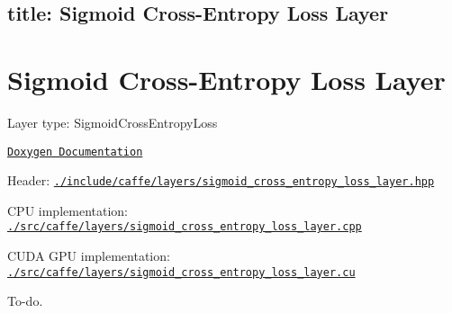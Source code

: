 

 \subsection*{title\+: Sigmoid Cross-\/\+Entropy Loss Layer }

\section*{Sigmoid Cross-\/\+Entropy Loss Layer}


\begin{DoxyItemize}
\item Layer type\+: {\ttfamily Sigmoid\+Cross\+Entropy\+Loss}
\item \href{http://caffe.berkeleyvision.org/doxygen/classcaffe_1_1SigmoidCrossEntropyLossLayer.html}{\tt Doxygen Documentation}
\item Header\+: \href{https://github.com/BVLC/caffe/blob/master/include/caffe/layers/sigmoid_cross_entropy_loss_layer.hpp}{\tt {\ttfamily ./include/caffe/layers/sigmoid\+\_\+cross\+\_\+entropy\+\_\+loss\+\_\+layer.hpp}}
\item C\+PU implementation\+: \href{https://github.com/BVLC/caffe/blob/master/src/caffe/layers/sigmoid_cross_entropy_loss_layer.cpp}{\tt {\ttfamily ./src/caffe/layers/sigmoid\+\_\+cross\+\_\+entropy\+\_\+loss\+\_\+layer.cpp}}
\item C\+U\+DA G\+PU implementation\+: \href{https://github.com/BVLC/caffe/blob/master/src/caffe/layers/sigmoid_cross_entropy_loss_layer.cu}{\tt {\ttfamily ./src/caffe/layers/sigmoid\+\_\+cross\+\_\+entropy\+\_\+loss\+\_\+layer.cu}}
\end{DoxyItemize}

To-\/do. 